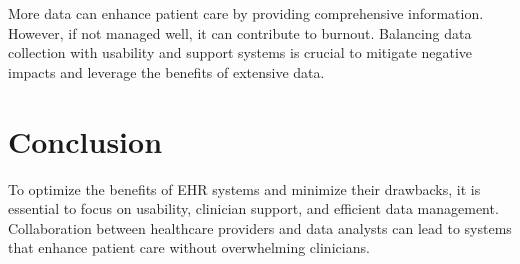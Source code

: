 \documentclass{article}
\begin{document}
More data can enhance patient care by providing comprehensive information. However, if not managed well, it can contribute to burnout. Balancing data collection with usability and support systems is crucial to mitigate negative impacts and leverage the benefits of extensive data.

\section*{Conclusion}

To optimize the benefits of EHR systems and minimize their drawbacks, it is essential to focus on usability, clinician support, and efficient data management. Collaboration between healthcare providers and data analysts can lead to systems that enhance patient care without overwhelming clinicians.
\end{document}
